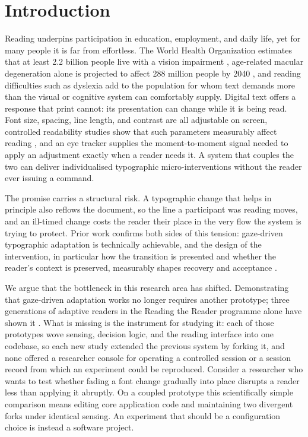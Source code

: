 \section{Introduction}
\label{sec:intro}

Reading underpins participation in education, employment, and daily life, yet for many people it is far from effortless.
The World Health Organization estimates that at least 2.2 billion people live with a vision impairment \cite{who2026vision}, age-related macular degeneration alone is projected to affect 288 million people by 2040 \cite{apte2021amd}, and reading difficulties such as dyslexia add to the population for whom text demands more than the visual or cognitive system can comfortably supply.
Digital text offers a response that print cannot: its presentation can change while it is being read.
Font size, spacing, line length, and contrast are all adjustable on screen, controlled readability studies show that such parameters measurably affect reading \cite{rello2016makeitbig, beymer2008eyetracking, beier2021letterspacing}, and an eye tracker supplies the moment-to-moment signal needed to apply an adjustment exactly when a reader needs it.
A system that couples the two can deliver individualised typographic micro-interventions \cite{persson2025microintervention} without the reader ever issuing a command.

The promise carries a structural risk.
A typographic change that helps in principle also reflows the document, so the line a participant was reading moves, and an ill-timed change costs the reader their place in the very flow the system is trying to protect.
Prior work confirms both sides of this tension: gaze-driven typographic adaptation is technically achievable, and the design of the intervention, in particular how the transition is presented and whether the reader's context is preserved, measurably shapes recovery and acceptance \cite{pereira2024typography, jensen2025context}.

We argue that the bottleneck in this research area has shifted.
Demonstrating that gaze-driven adaptation works no longer requires another prototype; three generations of adaptive readers in the Reading the Reader programme alone have shown it \cite{refsgaard2024rtr, pereira2024typography, palinec2024reactive}.
What is missing is the instrument for studying it: each of those prototypes wove sensing, decision logic, and the reading interface into one codebase, so each new study extended the previous system by forking it, and none offered a researcher console for operating a controlled session or a session record from which an experiment could be reproduced.
Consider a researcher who wants to test whether fading a font change gradually into place disrupts a reader less than applying it abruptly.
On a coupled prototype this scientifically simple comparison means editing core application code and maintaining two divergent forks under identical sensing.
An experiment that should be a configuration choice is instead a software project.

